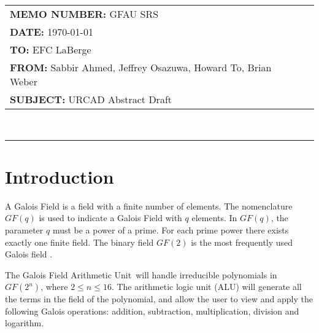 \documentclass[12pt]{extarticle}
\newcommand{\team}{Galois Field Arithmetic Unit}
\newcommand{\Sabbir}{Sabbir Ahmed}
\newcommand{\Jeffrey}{Jeffrey Osazuwa}
\newcommand{\Howard}{Howard To}
\newcommand{\Brian}{Brian Weber}
\newcommand{\documentinfo}[5]{
    \begin{centering}
        \parbox{2in}{
        \begin{spacing}{1}
            \begin{flushleft}
                \begin{tabular}{l l} #1 \\ #2 \\ #3 \\ #4 \\ #5 \\
                \end{tabular}\\
                \rule{\textwidth}{1pt}
            \end{flushleft}
        \end{spacing} }
    \end{centering} }
\begin{document}
    \documentinfo {\textbf{MEMO NUMBER:} GFAU SRS} {\textbf{DATE:} \today}
    {\textbf{TO: } EFC LaBerge} {\textbf{FROM: }\Sabbir, \Jeffrey, \Howard,
    \Brian} {\textbf{SUBJECT: } URCAD Abstract Draft}
    \vspace{-0.1in}

    \section{Introduction} A Galois Field is a field with a finite number of
    elements. The nomenclature $GF(q)$ is used to indicate a Galois Field with
    $q$ elements. In $GF(q)$, the parameter $q$ must be a power of a prime. For
    each prime power there exists exactly one finite field. The binary field
    $GF(2)$ is the most frequently used Galois field \cite{wolfdef}.

    The \team~will handle irreducible polynomials in $GF(2^n)$, where $2 \leq
    n \leq 16$. The arithmetic logic unit (ALU) will generate all the terms in
    the field of the polynomial, and allow the user to view and apply the
    following Galois operations: addition, subtraction, multiplication,
    division and logarithm.
\end{document}
